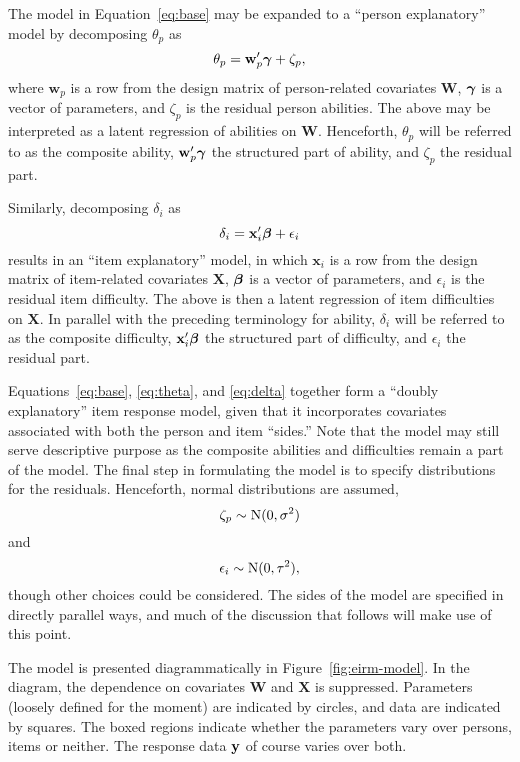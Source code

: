 \documentclass[12pt, letterpaper]{article}
\begin{document}
The model in Equation~\ref{eq:base} may be expanded to a ``person explanatory'' model by decomposing $\theta_p$ as
\begin{equation} \label{eq:theta}
	\theta_p = \mathbf{w}_p' \boldsymbol{\gamma} + \zeta_p
,\end{equation}
where $\mathbf{w}_p$ is a row from the design matrix of person-related covariates $\mathbf{W}$, $\boldsymbol{\gamma}$ is a vector of parameters, and $\zeta_p$ is the residual person abilities. The above may be interpreted as a latent regression of abilities on $\mathbf{W}$. Henceforth, $\theta_p$ will be referred to as the composite ability, $\mathbf{w}_p' \boldsymbol{\gamma}$ the structured part of ability, and $\zeta_p$ the residual part. 

Similarly, decomposing $\delta_i$ as
\begin{equation} \label{eq:delta}
	\delta_i = \mathbf{x}_i' \boldsymbol{\beta} + \epsilon_i
\end{equation}
results in an ``item explanatory'' model, in which $\mathbf{x}_i$ is a row from the design matrix of item-related covariates $\mathbf{X}$, $\boldsymbol{\beta}$ is a vector of parameters, and $\epsilon_i$ is the residual item difficulty. The above is then a latent regression of item difficulties on $\mathbf{X}$. In parallel with the preceding terminology for ability, $\delta_i$ will be referred to as the composite difficulty, $\mathbf{x}_i' \boldsymbol{\beta}$ the structured part of difficulty, and $\epsilon_i$ the residual part. 

Equations~\ref{eq:base}, \ref{eq:theta}, and \ref{eq:delta} together form a ``doubly explanatory'' item response model, given that it incorporates covariates associated with both the person and item ``sides.'' Note that the model may still serve descriptive purpose as the composite abilities and difficulties remain a part of the model. The final step in formulating the model is to specify distributions for the residuals. Henceforth, normal distributions are assumed, 
\begin{equation}
	\zeta_p \sim \mathrm{N}(0, \sigma^2)
\end{equation}
and
\begin{equation}
	\epsilon_i \sim \mathrm{N}(0, \tau^2)
,\end{equation}
though other choices could be considered. The sides of the model are specified in directly parallel ways, and much of the discussion that follows will make use of this point.

The model is presented diagrammatically in Figure~\ref{fig:eirm-model}. In the diagram, the dependence on covariates $\mathbf{W}$ and $\mathbf{X}$ is suppressed. Parameters (loosely defined for the moment) are indicated by circles, and data are indicated by squares. The boxed regions indicate whether the parameters vary over persons, items or neither. The response data $\mathbf{y}$ of course varies over both.
\end{document}
